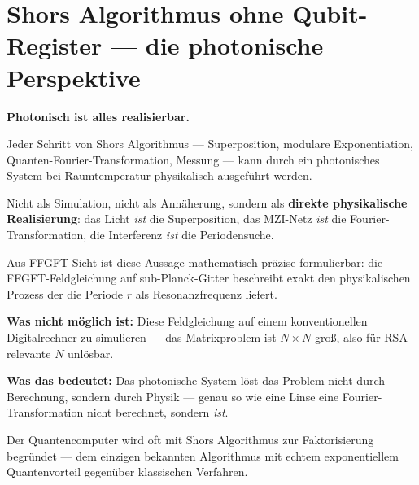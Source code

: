 
\providecommand{\ket}[1]{\left|#1\right\rangle}
\providecommand{\bra}[1]{\left\langle#1\right|}
\providecommand{\braket}[2]{\left\langle#1\middle|#2\right\rangle}

\section{Shors Algorithmus ohne Qubit-Register ---
  die photonische Perspektive}
\label{sec:shor-photon}

\begin{significance}
\textbf{Photonisch ist alles realisierbar.}

Jeder Schritt von Shors Algorithmus ---
Superposition, modulare Exponentiation,
Quanten-Fourier-Transformation, Messung ---
kann durch ein photonisches System bei
Raumtemperatur physikalisch ausgeführt werden.

Nicht als Simulation, nicht als Annäherung,
sondern als \textbf{direkte physikalische Realisierung}:
das Licht \emph{ist} die Superposition,
das MZI-Netz \emph{ist} die Fourier-Transformation,
die Interferenz \emph{ist} die Periodensuche.

Aus FFGFT-Sicht ist diese Aussage mathematisch
präzise formulierbar:
die FFGFT-Feldgleichung auf sub-Planck-Gitter
beschreibt exakt den physikalischen Prozess
der die Periode $r$ als Resonanzfrequenz liefert.

\medskip
\textbf{Was nicht möglich ist:}
Diese Feldgleichung auf einem konventionellen
Digitalrechner zu simulieren ---
das Matrixproblem ist $N \times N$ groß,
also für RSA-relevante $N$ unlösbar.

\medskip
\textbf{Was das bedeutet:}
Das photonische System löst das Problem
nicht durch Berechnung, sondern durch Physik ---
genau so wie eine Linse eine Fourier-Transformation
nicht berechnet, sondern \emph{ist}.
\end{significance}

Der Quantencomputer wird oft mit Shors Algorithmus
zur Faktorisierung begründet --- dem einzigen
bekannten Algorithmus mit echtem exponentiellem
Quantenvorteil gegenüber klassischen Verfahren.

